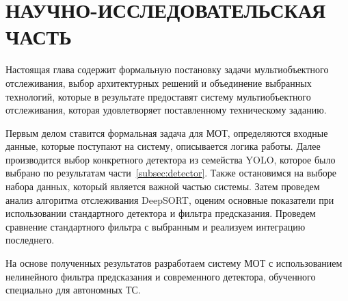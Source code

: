 \chapter{НАУЧНО-ИССЛЕДОВАТЕЛЬСКАЯ ЧАСТЬ}

Настоящая глава содержит формальную постановку задачи мультиобъектного отслеживания, выбор архитектурных решений и объединение выбранных технологий, которые в результате предоставят систему мультиобъектного отслеживания, которая удовлетворяет поставленному техническому заданию. 

Первым делом ставится формальная задача для МОТ, определяются входные данные, которые поступают на систему, описывается логика работы. Далее производится выбор конкретного детектора из семейства YOLO, которое было выбрано по результатам части~\ref{subsec:detector}. Также остановимся на выборе набора данных, который является важной частью системы. Затем проведем анализ алгоритма отслеживания DeepSORT, оценим основные показатели при использовании стандартного детектора и фильтра предсказания. Проведем сравнение стандартного фильтра с выбранным и реализуем интеграцию последнего.

На основе полученных результатов разработаем систему МОТ с использованием нелинейного фильтра предсказания и современного детектора, обученного специально для автономных ТС.









